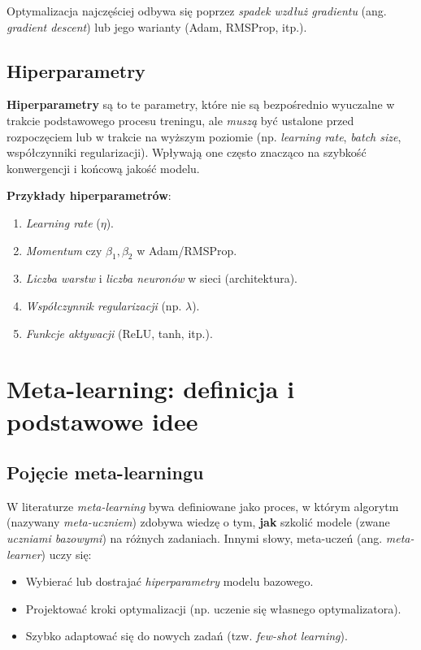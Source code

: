 \documentclass[12pt,a4paper]{article}
\begin{document}
Optymalizacja najczęściej odbywa się poprzez \emph{spadek wzdłuż gradientu} (ang. \emph{gradient descent}) lub jego warianty (Adam, RMSProp, itp.). 

\subsection{Hiperparametry}
\label{sec:hyperparams}

\textbf{Hiperparametry} są to te parametry, które nie są bezpośrednio wyuczalne w trakcie podstawowego procesu treningu, ale \emph{muszą} być ustalone przed rozpoczęciem lub w trakcie na wyższym poziomie (np. \emph{learning rate}, \emph{batch size}, współczynniki regularizacji). Wpływają one często znacząco na szybkość konwergencji i końcową jakość modelu.

\textbf{Przykłady hiperparametrów}:
\begin{enumerate}
    \item \textit{Learning rate} (\(\eta\)).
    \item \textit{Momentum} czy \(\beta_1, \beta_2\) w Adam/RMSProp.
    \item \textit{Liczba warstw} i \textit{liczba neuronów} w sieci (architektura).
    \item \textit{Współczynnik regularizacji} (np. \(\lambda\)).
    \item \textit{Funkcje aktywacji} (ReLU, tanh, itp.).
\end{enumerate}

\section{Meta-learning: definicja i podstawowe idee}

\subsection{Pojęcie meta-learningu}

W literaturze \citep{hochreiter2001learning,finn2017maml,ravi2016optimization} \emph{meta-learning} bywa definiowane jako proces, w którym algorytm (nazywany \emph{meta-uczniem}) zdobywa wiedzę o tym, \textbf{jak} szkolić modele (zwane \emph{uczniami bazowymi}) na różnych zadaniach. Innymi słowy, meta-uczeń (ang. \emph{meta-learner}) uczy się:
\begin{itemize}
    \item Wybierać lub dostrajać \emph{hiperparametry} modelu bazowego.
    \item Projektować kroki optymalizacji (np. uczenie się własnego optymalizatora).
    \item Szybko adaptować się do nowych zadań (tzw. \emph{few-shot learning}).
\end{itemize}
\end{document}

